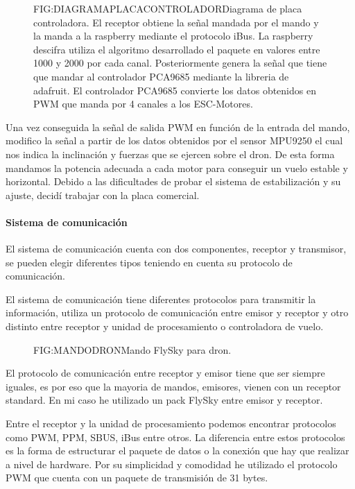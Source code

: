 \begin{figure}[Diagrama placa controladora desarrollada]{FIG:DIAGRAMAPLACACONTROLADOR}{Diagrama de placa controladora. El receptor obtiene la señal mandada por el mando y la manda a la raspberry mediante el protocolo iBus. La raspberry descifra utiliza el algoritmo desarrollado el paquete en valores entre 1000 y 2000 por cada canal. Posteriormente genera la señal que tiene que mandar al controlador PCA9685 mediante la libreria de adafruit. El controlador PCA9685 convierte los datos obtenidos en PWM que manda por 4 canales a los ESC-Motores.}
\end{figure}

Una vez conseguida la señal de salida PWM en función de la entrada del mando, modifico la señal a partir de los datos obtenidos por el sensor MPU9250 el cual nos indica la inclinación y fuerzas que se ejercen sobre el dron.
De esta forma mandamos la potencia adecuada a cada motor para conseguir un vuelo estable y horizontal. Debido a las dificultades de probar el sistema de estabilización y su ajuste, decidí trabajar con la placa comercial.

\paragraph{Sistema de comunicación}

	El sistema de comunicación cuenta con dos componentes, receptor y transmisor, se pueden elegir diferentes tipos teniendo en cuenta su protocolo de comunicación. 
	
	El sistema de comunicación tiene diferentes protocolos para transmitir la información, utiliza un protocolo de comunicación entre emisor y receptor y otro distinto entre receptor y unidad de procesamiento o controladora de vuelo.\cite{Eric2017}
	
	\begin{figure}[Mando FlySky dron]{FIG:MANDODRON}{Mando FlySky para dron.}
\end{figure}	
	
	El protocolo de comunicación entre receptor y emisor tiene que ser siempre iguales, es por eso que la mayoria de mandos, emisores, vienen con un receptor standard. En mi caso he utilizado un pack FlySky entre emisor y receptor.
	
	Entre el receptor y la unidad de procesamiento podemos encontrar protocolos como PWM, PPM, SBUS, iBus entre otros. La diferencia entre estos protocolos es la forma de estructurar el paquete de datos o la conexión que hay que realizar a nivel de hardware. Por su simplicidad y comodidad he utilizado el protocolo PWM que cuenta con un paquete de transmisión de 31 bytes.
	
